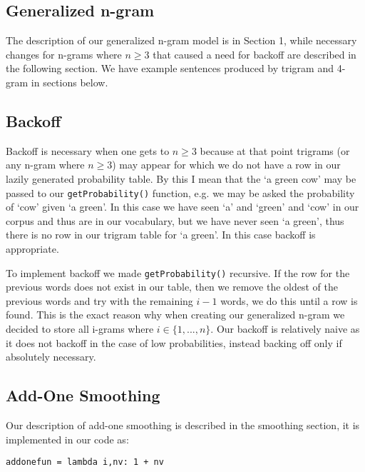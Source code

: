 \documentclass{article}
\begin{document}
\subsection{Generalized n-gram}
The description of our generalized n-gram model is in Section 1, while necessary changes for n-grams where $n\geq3$ that caused a need for backoff are described in the following section. We have example sentences produced by trigram and 4-gram in sections below.

\subsection{Backoff}
Backoff is necessary when one gets to $n \geq 3$ because at that point trigrams (or any n-gram where $n \geq 3$) may appear for which we do not have a row in our lazily generated probability table. By this I mean that the `a green cow' may be passed to our \texttt{getProbability()} function, e.g. we may be asked the probability of `cow' given `a green'. In this case we have seen `a' and `green' and `cow' in our corpus and thus are in our vocabulary, but we have never seen `a green', thus there is no row in our trigram table for `a green'. In this case backoff is appropriate. 

To implement backoff we made \texttt{getProbability()} recursive. If the row for the previous words does not exist in our table, then we remove the oldest of the previous words and try with the remaining $i-1$ words, we do this until a row is found. This is the exact reason why when creating our generalized n-gram we decided to store all i-grams where $i \in \lbrace 1,...,n \rbrace$. Our backoff is relatively naive as it does not backoff in the case of low probabilities, instead backing off only if absolutely necessary.

\subsection{Add-One Smoothing}
Our description of add-one smoothing is described in the smoothing section, it is implemented in our code as: \begin{verbatim}
addonefun = lambda i,nv: 1 + nv
\end{verbatim}
\end{document}
